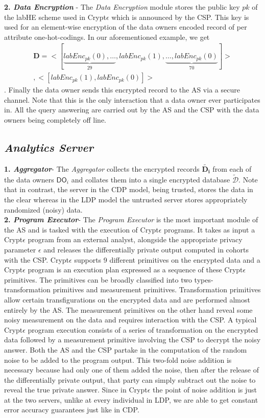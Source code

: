 \textbf{2. \textit{Data Encryption}} - The \textit{Data Encryption} module stores the public key $pk$ of the labHE scheme used in Crypt$\epsilon$ which is announced by the CSP. This key is used for an element-wise encryption of the data owners encoded record of per attribute one-hot-codings. In our aforementioned example, we get \begin{gather*}\mathbf{D}=<[\underbrace{labEnc_{pk}(0),\ldots}_{29},labEnc_{pk}(1),\underbrace{\ldots,labEnc_{pk}(0)}_{70}]>\\,
<[labEnc_{pk}(1),labEnc_{pk}(0)]>\end{gather*}. Finally the data owner sends this encrypted record to the AS via a secure channel. Note that this is the only interaction that a data owner ever participates in. All the query answering are carried out by the \textsf{AS} and the \textsf{CSP} with the data owners being completely off line.
\subsection*{\textit{Analytics Server}}

\textbf{1.\textit{ Aggregator}}- The \textit{Aggregator} collects the encrypted records $\mathbf{\tilde{D_i}}$ from each of the data owners $\textsf{DO}_i$ and collates them into a single encrypted database $\boldsymbol{\tilde{\mathcal{D}}}$. Note that in contrast, the server in the \textsf{CDP} model, being trusted, stores the data in the clear whereas in the \textsf{LDP} model the untrusted server stores appropriately randomized (noisy) data.    \\\textbf{2.\textit{ Program Executor}}- The \textit{Program Executor} is the most important module of the \textsf{AS} and is tasked with the execution of Crypt$\epsilon$ programs. It takes as input a Crypt$\epsilon$ program from an external analyst, alongside the appropriate privacy parameter $\epsilon$ and releases the differentially private output computed in cohorts with the CSP. Crypt$\epsilon$ supports 9 different primitives on the encrypted data and a Crypt$\epsilon$ program is an execution plan expressed as a sequence of these Crypt$\epsilon$ primitives. The primitives can be broadly classified into two types- transformation primitives and measurement primitives. Transformation primitives allow certain transfigurations on the encrypted data and are performed almost entirely by the \textsf{AS}. The measurement primitives on the other hand reveal some noisy measurement on the data and requires interaction with the \textsf{CSP}. A typical Crypt$\epsilon$ program execution consists of  a series of transformation on the encrypted data followed by a measurement primitive involving the \textsf{CSP} to decrypt the noisy answer. Both the \textsf{AS} and the \textsf{CSP} partake in the computation of the random noise to be added to the program output. This two-fold noise addition is necessary because  had only one of them added the noise, then after the release of the differentially private output, that party can simply subtract out the noise to reveal the true private answer. Since in Crypt$\epsilon$ the point of noise addition is just at the two servers, unlike at every individual in \textsf{LDP}, we are able to get constant error accuracy guarantees just like in \textsf{CDP}. 
